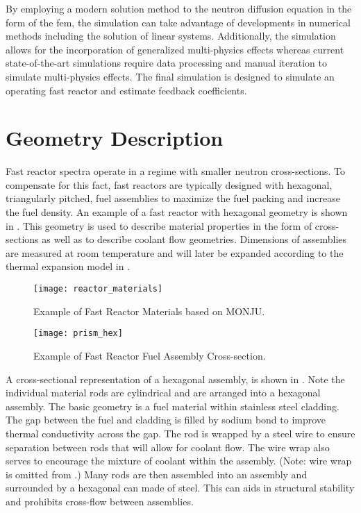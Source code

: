  By employing a modern solution method to the neutron diffusion
  equation in the form of the \gls{fem}, the simulation can take advantage of 
  developments in numerical methods including the solution of linear systems. 
  Additionally, the simulation allows for the incorporation of generalized 
  multi-physics effects whereas current state-of-the-art simulations require 
  data processing and manual iteration to simulate multi-physics effects. The 
  final simulation is designed to simulate an operating fast reactor and 
  estimate feedback coefficients.

\section{Geometry Description}
  \label{sec:geometry_description}
  Fast reactor spectra operate in a regime with smaller neutron cross-sections.
  To compensate for this fact, fast reactors are typically designed with 
  hexagonal, triangularly pitched, fuel assemblies to maximize the fuel packing 
  and increase the fuel density. An example of a fast reactor with hexagonal 
  geometry is shown in .
  This geometry is used to describe material properties in the form of 
  cross-sections as well as to describe coolant flow geometries. Dimensions of 
  assemblies are measured at room temperature and will later be expanded 
  according to the thermal expansion model in .
  
  \begin{figure}
    \centering
    \texttt{[image: reactor\_materials]}
    \caption{Example of Fast Reactor Materials based on MONJU.}
    \label{fig:reactor_materials}
  \end{figure}

  \begin{figure}
    \centering
    \texttt{[image: prism\_hex]}
    \caption{Example of Fast Reactor Fuel Assembly Cross-section.}
    \label{fig:prism_hex}
  \end{figure}

  A cross-sectional representation of a hexagonal assembly, is shown in 
  . 
  Note the individual material rods are cylindrical and are arranged
  into a hexagonal assembly. The basic geometry is a fuel material within
  stainless steel cladding. The gap between the fuel and cladding is filled by
  sodium bond to improve thermal conductivity across the gap. The rod is
  wrapped by a steel wire to ensure separation between rods that will allow for
  coolant flow. The wire wrap also serves to encourage the mixture of coolant
  within the assembly. (Note: wire wrap is omitted from .) 
  Many rods are then assembled into an assembly and surrounded by a hexagonal 
  can made of steel. This can aids in structural stability and prohibits 
  cross-flow between assemblies. 

